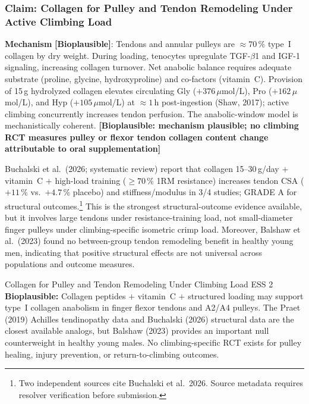 \subsubsection{Claim: Collagen for Pulley and Tendon Remodeling Under Active Climbing Load}

\textbf{Mechanism} \textbf{[Bioplausible]}: Tendons and annular pulleys are ${\approx}70\,\%$ type~I collagen by dry weight. During loading, tenocytes upregulate TGF-$\beta$1 and IGF-1 signaling, increasing collagen turnover. Net anabolic balance requires adequate substrate (proline, glycine, hydroxyproline) and co-factors (vitamin~C). Provision of 15\,g hydrolyzed collagen elevates circulating Gly ($+376$\,$\mu$mol/L), Pro ($+162$\,$\mu$mol/L), and Hyp ($+105$\,$\mu$mol/L) at ${\approx}1$\,h post-ingestion (Shaw, 2017); active climbing concurrently increases tendon perfusion. The anabolic-window model is mechanistically coherent. \textbf{[Bioplausible: mechanism plausible; no climbing RCT measures pulley or flexor tendon collagen content change attributable to oral supplementation]}

Buchalski et al.\ (2026; systematic review) report that collagen 15--30\,g/day $+$ vitamin~C $+$ high-load training (${\geq}70\,\%$ 1RM resistance) increases tendon CSA ($+11\,\%$ vs.\ $+4.7\,\%$ placebo) and stiffness/modulus in 3/4 studies; GRADE A for structural outcomes.\footnote{Two independent sources cite Buchalski et al.\ 2026. Source metadata requires resolver verification before submission.} This is the strongest structural-outcome evidence available, but it involves large tendons under resistance-training load, not small-diameter finger pulleys under climbing-specific isometric crimp load. Moreover, Balshaw et al.\ (2023) found no between-group tendon remodeling benefit in healthy young men, indicating that positive structural effects are not universal across populations and outcome measures.

\begin{bioplausbox}{Collagen for Pulley and Tendon Remodeling Under Climbing Load \cdot \bioplausible \cdot ESS 2}
\textbf{Bioplausible:} Collagen peptides $+$ vitamin~C $+$ structured loading may support type~I collagen anabolism in finger flexor tendons and A2/A4 pulleys. The Praet (2019) Achilles tendinopathy data and Buchalski (2026) structural data are the closest available analogs, but Balshaw (2023) provides an important null counterweight in healthy young males. No climbing-specific RCT exists for pulley healing, injury prevention, or return-to-climbing outcomes.
\end{bioplausbox}


